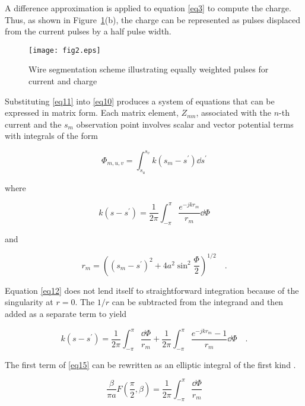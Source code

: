 \documentclass[12pt]{article}
\begin{document}
A difference approximation is applied to equation \eqref{eq3} to compute
the charge. Thus, as shown in Figure~\ref{fig2}(b), the charge can be
represented as pulses displaced from the current pulses by a half pulse
width.

\begin{figure}[htb]
\centerline{\texttt{[image: fig2.eps]}}
\caption{Wire segmentation scheme illustrating equally weighted pulses
for current and charge}
\label{fig2}
\end{figure}

Substituting \eqref{eq11} into \eqref{eq10} produces a system of
equations that can be expressed in matrix form. Each matrix element,
$Z_{mn}$, associated with the \mbox{$n$-th} current and the $s_m$ observation
point involves scalar and vector potential terms with integrals of the
form

\begin{equation}
\Phi_{m,u,v} = \int_{s_u}^{s_v} k(s_m - s^\prime)\dd{s^\prime}
\label{eq12}
\end{equation}

\noindent where

\begin{equation}
k(s-s^\prime) = \frac{1}{2\pi}\int_{-\pi}^\pi\frac{e^{-jkr_m}}{r_m}\dd{\Phi}
\label{eq13}
\end{equation}

\noindent and

\begin{equation}
r_m = \left((s_m - s^\prime)^2 + 4a^2\sin^2\frac{\Phi}{2}\right)^{1/2}
\quad.
\label{eq14}
\end{equation}

Equation \eqref{eq12} does not lend itself to straightforward
integration because of the singularity at $r=0$. The $1/r$ can be
subtracted from the integrand and then added as a separate term to yield

\begin{equation}
k(s-s^\prime) = \frac{1}{2\pi}\int_{-\pi}^\pi \frac{\dd{\Phi}}{r_m}
+\frac{1}{2\pi}\int_{-\pi}^\pi\frac{e^{-jkr_m}-1}{r_m}\dd{\Phi}
\quad.
\label{eq15}
\end{equation}

The first term of \eqref{eq15} can be rewritten as an elliptic integral
of the first kind \cite{r6}.

\begin{equation}
\frac{\beta}{\pi a}F\left(\frac{\pi}{2}, \beta\right) =
\frac{1}{2\pi}\int_{-\pi}^\pi\frac{\dd{\Phi}}{r_m}
\label{eq16}
\end{equation}
\end{document}
